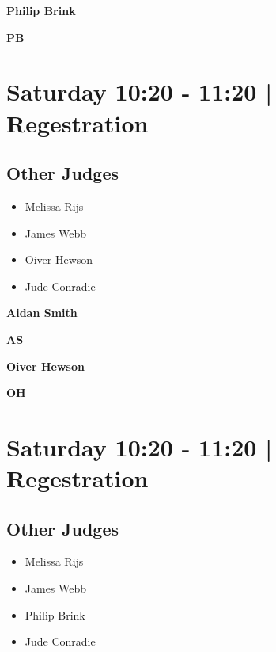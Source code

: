 \documentclass[10pt, A5]{article}
\newcommand{\newtitle}[1]{\begin{center}{\Huge\bfseries #1 }\\ \vspace{5mm}\end{center}}
\newcommand{\newsubtitle}[1]{\begin{center}{\color{grey}\Large\bfseries #1 }\\ \vspace{5mm}\end{center}}
\begin{document}
    
	\clearpage

		\newtitle{Philip Brink}
	\newsubtitle{PB}

            \section*{Saturday 10:20
        -
        11:20
        |
         Regestration}
        
                
        \subsection*{Other Judges}
        
            \begin{itemize}
                            \item Melissa Rijs
                            \item James Webb
                            \item Oiver Hewson
                            \item Jude Conradie
                        \end{itemize}
        

    
	\clearpage

		\newtitle{Aidan Smith}
	\newsubtitle{AS}

    
	\clearpage

		\newtitle{Oiver Hewson}
	\newsubtitle{OH}

            \section*{Saturday 10:20
        -
        11:20
        |
         Regestration}
        
                
        \subsection*{Other Judges}
        
            \begin{itemize}
                            \item Melissa Rijs
                            \item James Webb
                            \item Philip Brink
                            \item Jude Conradie
                        \end{itemize}
        
\end{document}
